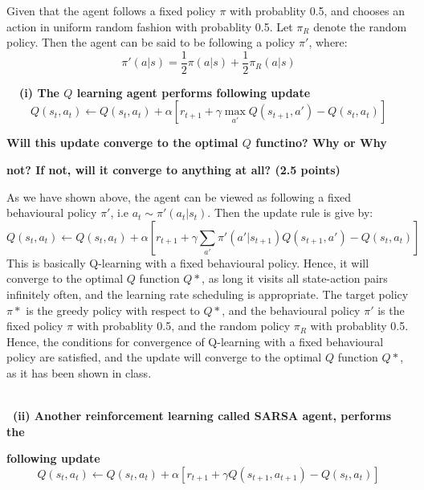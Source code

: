 \documentclass{article}
\begin{document}
Given that the agent follows a fixed policy $\pi$ with probablity 0.5, and chooses an action in uniform random fashion with probablity 0.5. Let $\pi_R$ denote the random policy. Then the agent can be said to be following a policy $\pi'$, where:
\begin{equation*}
	\pi'(a|s) = \frac{1}{2} \pi(a|s) + \frac{1}{2} \pi_R(a|s)
\end{equation*}

\noindent
\textbf{\quad\ \ (i) The $Q$ learning agent performs following update}
\begin{equation*}
	Q(s_t, a_t) \leftarrow Q(s_t, a_t) + \alpha \left[ r_{t+1} + \gamma \max_{a'} Q(s_{t+1}, a') - Q(s_t, a_t) \right]
\end{equation*}

\textbf{\quad Will this update converge to the optimal $Q$ functino? Why or Why}

\textbf{\quad not? If not, will it converge to anything at all? (2.5 points)}

As we have shown above, the agent can be viewed as following a fixed behavioural policy $\pi'$, i.e $a_t \sim \pi'(a_t|s_t)$. Then the update rule is give by: 
\begin{equation*}
	Q(s_t, a_t) \leftarrow Q(s_t, a_t) + \alpha \left[ r_{t+1} + \gamma \sum_{a'} \pi'(a'|s_{t+1}) Q(s_{t+1}, a') - Q(s_t, a_t) \right]
\end{equation*}
This is basically Q-learning with a fixed behavioural policy. Hence, it will converge to the optimal $Q$ function $Q*$, as long it visits all state-action pairs infinitely often, and the learning rate scheduling is appropriate. The target policy $\pi*$ is the greedy policy with respect to $Q*$, and the behavioural policy $\pi'$ is the fixed policy $\pi$ with probablity 0.5, and the random policy $\pi_R$ with probablity 0.5. Hence, the conditions for convergence of Q-learning with a fixed behavioural policy are satisfied, and the update will converge to the optimal $Q$ function $Q*$, as it has been shown in class.

\,\\
\noindent
\textbf{\quad\ (ii) Another reinforcement learning called SARSA agent, performs the}

\textbf{\quad following update}
\begin{equation*}
	Q(s_t, a_t) \leftarrow Q(s_t, a_t) + \alpha \left[ r_{t+1} + \gamma Q(s_{t+1}, a_{t+1}) - Q(s_t, a_t) \right]
\end{equation*}
\end{document}
